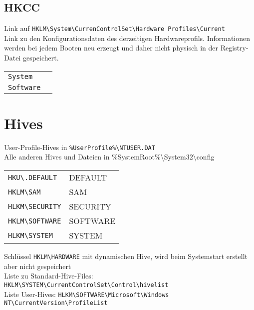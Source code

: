 \begin{multicols}{3}
\subsection{HKCC}
Link auf \texttt{HKLM\textbackslash System\textbackslash CurrenControlSet\textbackslash Hardware Profiles\textbackslash Current}\\
Link zu den Konfigurationsdaten des derzeitigen Hardwareprofils. Informationen werden bei jedem Booten neu erzeugt und daher nicht physisch in der Registry-Datei gespeichert.
\settowidth{\MyLen}{HLKM.folder.}
\begin{tabular}{@{}p{\the\MyLen}%
		@{}p{\linewidth-\the\MyLen}@{}}
	\texttt{System} & \\
	\texttt{Software} & \\
\end{tabular}

\section{Hives}
User-Profile-Hives in \texttt{\%UserProfile\%\textbackslash NTUSER.DAT}\\
Alle anderen Hives und Dateien in \%SystemRoot\%\textbackslash System32\textbackslash config
\begin{tabular}{@{}p{\the\MyLen}%
		@{}p{\linewidth-\the\MyLen}@{}}
	\texttt{HKU\textbackslash .DEFAULT} & DEFAULT\\
	\texttt{HKLM\textbackslash SAM} & SAM\\
	\texttt{HLKM\textbackslash SECURITY} & SECURITY\\
	\texttt{HKLM\textbackslash SOFTWARE} & SOFTWARE\\
	\texttt{HLKM\textbackslash SYSTEM} & SYSTEM\\
\end{tabular}
Schlüssel \texttt{HKLM\textbackslash HARDWARE} mit dynamischen Hive, wird beim Systemstart erstellt aber nicht gespeichert\\
Liste zu Standard-Hive-Files: \texttt{HKLM\textbackslash SYSTEM\textbackslash CurrentControlSet\textbackslash Control\textbackslash hivelist}\\
Liste User-Hives: \texttt{HLKM\textbackslash SOFTWARE\textbackslash Microsoft\textbackslash Windows NT\textbackslash CurrentVersion\textbackslash ProfileList}


\end{multicols}
